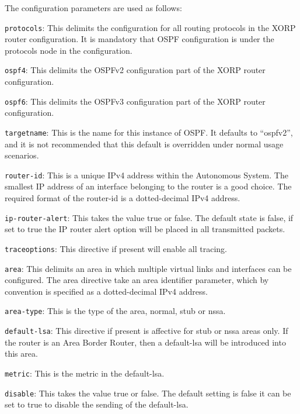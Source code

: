 The configuration parameters are used as follows:
\begin{description}
\item{\tt protocols}: This delimits the configuration for all routing
  protocols in the XORP router configuration.  It is mandatory that
  OSPF configuration is under the {\stt protocols} node in the
  configuration.
\item{\tt ospf4}: This delimits the OSPFv2 configuration part of the XORP
  router configuration.
\item{\tt ospf6}: This delimits the OSPFv3 configuration part of the XORP
  router configuration.
\item{\tt targetname}: This is the name for this instance of OSPF.  It
  defaults to ``{\stt ospfv2}'', and it is not recommended that this
  default is overridden under normal usage scenarios.
\item{\tt router-id}: This is a unique IPv4 address within the
Autonomous System. The smallest IP address of an interface belonging
to the router is a good choice. The required format of the {\stt
router-id} is a dotted-decimal IPv4 address.
\item{\tt ip-router-alert}: This takes the value {\stt true} or {\stt
false}. The default state is {\stt false}, if set to {\stt true} the
IP router alert option will be placed in all transmitted packets.
\item{\tt traceoptions}: This directive if present will enable all tracing.
\item{\tt area}: This delimits an area in which multiple virtual links
and interfaces can be configured. The {\stt area} directive take an
area identifier parameter, which by convention is specified as a
dotted-decimal IPv4 address.
\begin{description}

\item{\tt area-type}: This is the type of the area, {\stt normal},
{\stt stub} or {\stt nssa}.

\item{\tt default-lsa}: This directive if present is affective for
{\stt stub} or {\stt nssa} areas only. If the router is an Area Border
Router, then a default-lsa will be introduced into this area.
\begin{description}
\item{\tt metric}: This is the metric in the default-lsa.
\item{\tt disable}: This takes the value {\stt true} or {\stt
false}. The default setting is {\stt false} it can be set to {\stt
true} to disable the sending of the default-lsa.
\end{description}
\end{description}
\begin{description}


\end{description}
\end{description}
